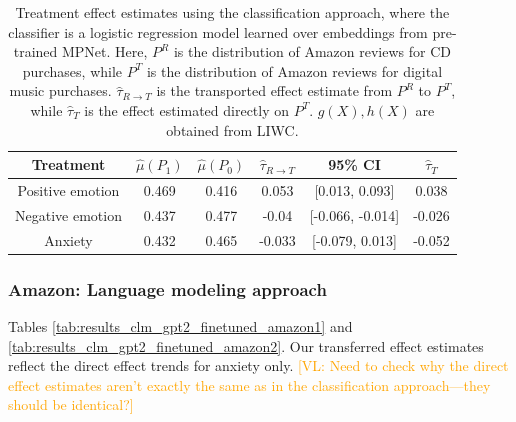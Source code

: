 \documentclass{article}
\newcommand{\vl}[1]{\textcolor{orange}{[VL: #1]}}
\begin{document}
\begin{table}[!ht]
    \centering
    \begin{tabular}{c|ccccc}
    \toprule
    Treatment & $\hat{\mu}(P_1)$ & $\hat{\mu}(P_0)$ & $\hat{\tau}_{R \rightarrow T}$ & 95\% CI & $\hat{\tau}_T$ \\
    \midrule
    Positive emotion & 0.469 & 0.416 &  0.053 & [0.013, 0.093]   &      0.038 \\
    Negative emotion & 0.437 & 0.477 & -0.04  & [-0.066, -0.014] &     -0.026 \\
    Anxiety    & 0.432 & 0.465 & -0.033 & [-0.079, 0.013]  &     -0.052 \\
    \bottomrule
    \end{tabular}
    \caption{Treatment effect estimates using the classification approach, where the classifier is a logistic regression model learned over embeddings from pre-trained MPNet. Here, $P^R$ is the distribution of Amazon reviews for CD purchases, while $P^T$ is the distribution of Amazon reviews for digital music purchases. $\hat{\tau}_{R \rightarrow T}$ is the transported effect estimate from $P^R$ to $P^T$, while $\hat{\tau}_T$ is the effect estimated directly on $P^T$. $g(X), h(X)$ are obtained from LIWC.}
    \label{tab:results_clf_mpnet_amazon2}
\end{table}

\subsubsection{Amazon: Language modeling approach}

Tables \ref{tab:results_clm_gpt2_finetuned_amazon1} and \ref{tab:results_clm_gpt2_finetuned_amazon2}. Our transferred effect estimates reflect the direct effect trends for anxiety only. \vl{Need to check why the direct effect estimates aren't exactly the same as in the classification approach---they should be identical?}
\end{document}
